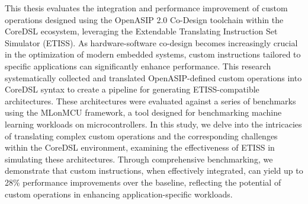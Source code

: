 This thesis evaluates the integration and performance improvement of custom operations designed using the OpenASIP 2.0 Co-Design toolchain within the CoreDSL ecosystem, leveraging the Extendable Translating Instruction Set Simulator (ETISS). As hardware-software co-design becomes increasingly crucial in the optimization of modern embedded systems, custom instructions tailored to specific applications can significantly enhance performance. This research systematically collected and translated OpenASIP-defined custom operations into CoreDSL syntax to create a pipeline for generating ETISS-compatible architectures. These architectures were evaluated against a series of benchmarks using the MLonMCU framework, a tool designed for benchmarking machine learning workloads on microcontrollers. In this study, we delve into the intricacies of translating complex custom operations and the corresponding challenges within the CoreDSL environment, examining the effectiveness of ETISS in simulating these architectures. Through comprehensive benchmarking, we demonstrate that custom instructions, when effectively integrated, can yield up to 28\% performance improvements over the baseline, reflecting the potential of custom operations in enhancing application-specific workloads.